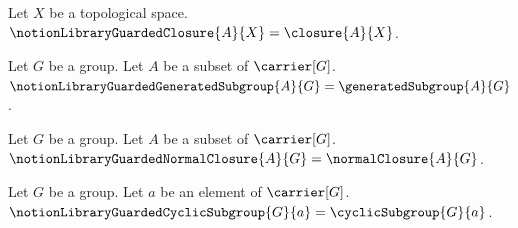 



\begin{definition}\label{notion_library_guarded_closure}
    Let $X$ be a topological space.
    $\notionLibraryGuardedClosure{A}{X}=\closure{A}{X}$.
\end{definition}

\begin{definition}\label{notion_library_guarded_generated_subgroup}
    Let $G$ be a group.
    Let $A$ be a subset of $\carrier[G]$.
    $\notionLibraryGuardedGeneratedSubgroup{A}{G}
        =\generatedSubgroup{A}{G}$.
\end{definition}

\begin{definition}\label{notion_library_guarded_normal_closure}
    Let $G$ be a group.
    Let $A$ be a subset of $\carrier[G]$.
    $\notionLibraryGuardedNormalClosure{A}{G}=\normalClosure{A}{G}$.
\end{definition}

\begin{definition}\label{notion_library_guarded_cyclic_subgroup}
    Let $G$ be a group.
    Let $a$ be an element of $\carrier[G]$.
    $\notionLibraryGuardedCyclicSubgroup{G}{a}=\cyclicSubgroup{G}{a}$.
\end{definition}
